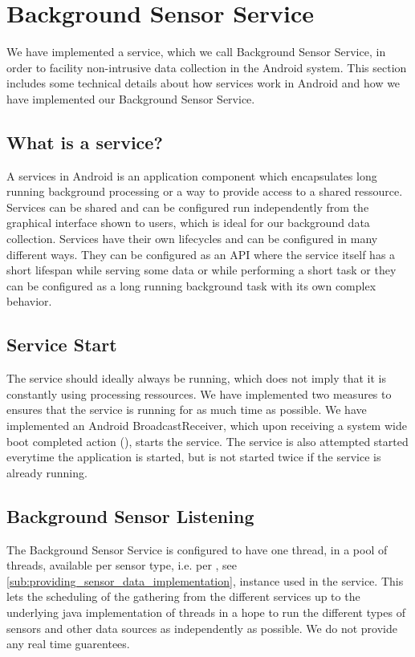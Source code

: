 
\section{Background Sensor Service}
\label{sec:background_sensor_service}

We have implemented a service, which we call Background Sensor Service, in order to facility non-intrusive data collection in the Android system. 
This section includes some technical details about how services work in Android and how we have implemented our Background Sensor Service. 

\subsection{What is a service?}

A services in Android is an application component which encapsulates long running background processing or a way to provide access to a shared ressource. Services can be shared and can be configured run independently from the graphical interface shown to users, which is ideal for our background data collection. Services have their own lifecycles and can be configured in many different ways. They can be configured as an API where the service itself has a short lifespan while serving some data or while performing a short task or they can be configured as a long running background task with its own complex behavior. 

\subsection{Service Start}

The service should ideally always be running, which does not imply that it is constantly using processing ressources. We have implemented two measures to ensures that the service is running for as much time as possible. We have implemented an Android BroadcastReceiver, which upon receiving a system wide boot completed action (), starts the service. The service is also attempted started everytime the application is started, but is not started twice if the service is already running. 

\subsection{Background Sensor Listening}

The Background Sensor Service is configured to have one thread, in a pool of threads, available per sensor type, i.e. per , see \ref{sub:providing_sensor_data_implementation}, instance used in the service. This lets the scheduling of the gathering from the different services up to the underlying java implementation of threads in a hope to run the different types of sensors and other data sources as independently as possible. We do not provide any real time guarentees.   


